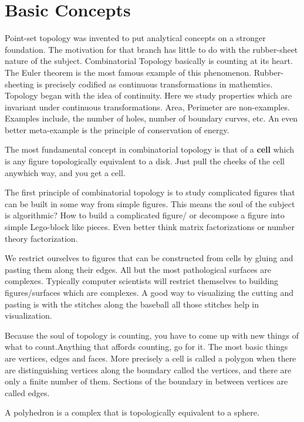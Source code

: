 \chapter{Basic Concepts}
\newchunk Point-set topology was invented to put analytical concepts on a stronger foundation. The motivation for that branch
has little to do with the rubber-sheet nature of the subject.
\newchunk Combinatorial Topology basically is counting at its heart. The Euler theorem is the most famous example of this
phenomenon. 
\newchunk Rubber-sheeting is precisely codified as continuous transformations in mathemtics. Topology began with the idea of
continuity. Here we study properties which are invariant under continuous transformations. Area, Perimeter are non-examples.
Examples include, the number of holes, number of boundary curves, etc. An even better meta-example is the principle of conservation
of energy. 

\newchunk The most fundamental concept in combinatorial topology is that of a \textbf{cell} which is any figure topologically equivalent
to a disk. Just pull the cheeks of the cell anywhich way, and you get a cell. 

\newchunk The first principle of combinatorial topology is to study complicated figures that can be built in some way
from simple figures. This means the soul of the subject is algorithmic? How to build a complicated figure/ or decompose
a figure into simple Lego-block like pieces. Even better think matrix factorizations or number theory factorization. 

\newchunk We restrict ourselves to figures that can be constructed from cells by gluing and pasting them along their edges. 
All but the most pathological surfaces are complexes. Typically computer scientists will restrict themselves to building
figures/surfaces which are complexes. A good way to visualizing the cutting and pasting is with the stitches along the baseball
all those stitches help in visualization. 

\newchunk Because the soul of topology is counting, you have to come up with new things of what to count.Anything that affords counting,
go for it. The most basic things are vertices, edges and faces. More precisely a cell is called a polygon when there are distinguishing
vertices along the boundary called the vertices, and there are only a finite number of them. Sections of the boundary in between
vertices are called edges. 

\newchunk A polyhedron is a complex that is topologically equivalent to a sphere. 

